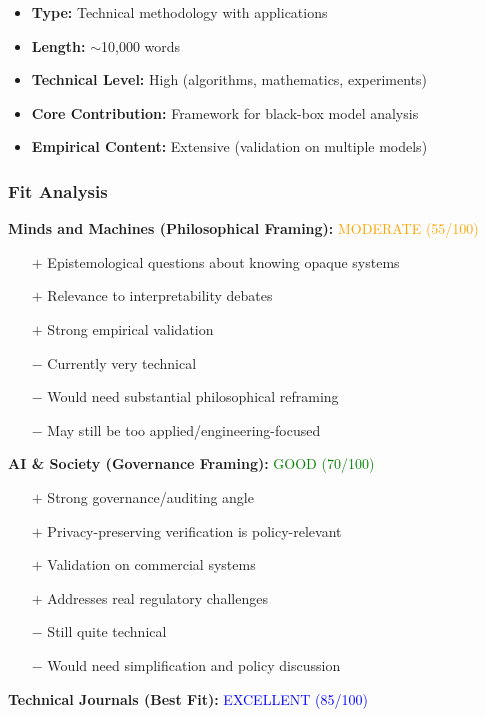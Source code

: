 \documentclass[12pt]{article}
\begin{document}
\begin{itemize}[leftmargin=*]
\item \textbf{Type:} Technical methodology with applications
\item \textbf{Length:} $\sim$10,000 words
\item \textbf{Technical Level:} High (algorithms, mathematics, experiments)
\item \textbf{Core Contribution:} Framework for black-box model analysis
\item \textbf{Empirical Content:} Extensive (validation on multiple models)
\end{itemize}

\subsubsection{Fit Analysis}

\textbf{Minds and Machines (Philosophical Framing):} \textcolor{orange}{MODERATE (55/100)}

\begin{itemize}[leftmargin=*]
\item[$+$] Epistemological questions about knowing opaque systems
\item[$+$] Relevance to interpretability debates
\item[$+$] Strong empirical validation
\item[$-$] Currently very technical
\item[$-$] Would need substantial philosophical reframing
\item[$-$] May still be too applied/engineering-focused
\end{itemize}

\textbf{AI \& Society (Governance Framing):} \textcolor{green}{GOOD (70/100)}

\begin{itemize}[leftmargin=*]
\item[$+$] Strong governance/auditing angle
\item[$+$] Privacy-preserving verification is policy-relevant
\item[$+$] Validation on commercial systems
\item[$+$] Addresses real regulatory challenges
\item[$-$] Still quite technical
\item[$-$] Would need simplification and policy discussion
\end{itemize}

\textbf{Technical Journals (Best Fit):} \textcolor{blue}{EXCELLENT (85/100)}
\end{document}
